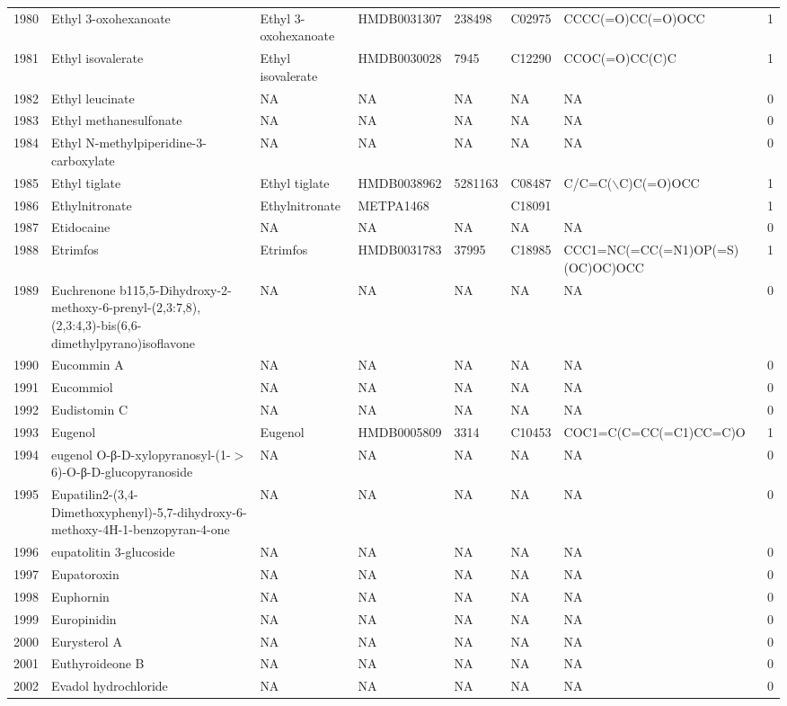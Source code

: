 \documentclass[a4paper]{article}
\begin{document}
\begin{longtable}{rlllllll}
  1980 & Ethyl 3-oxohexanoate & Ethyl 3-oxohexanoate & HMDB0031307 & 238498 & C02975 & CCCC(=O)CC(=O)OCC & 1 \\ 
  1981 & Ethyl isovalerate & Ethyl isovalerate & HMDB0030028 & 7945 & C12290 & CCOC(=O)CC(C)C & 1 \\ 
  1982 & Ethyl leucinate & NA & NA & NA & NA & NA & 0 \\ 
  1983 & Ethyl methanesulfonate & NA & NA & NA & NA & NA & 0 \\ 
  1984 & Ethyl N-methylpiperidine-3-carboxylate & NA & NA & NA & NA & NA & 0 \\ 
  1985 & Ethyl tiglate & Ethyl tiglate & HMDB0038962 & 5281163 & C08487 & C/C=C($\backslash$C)C(=O)OCC & 1 \\ 
  1986 & Ethylnitronate & Ethylnitronate & METPA1468 &  & C18091 &  & 1 \\ 
  1987 & Etidocaine & NA & NA & NA & NA & NA & 0 \\ 
  1988 & Etrimfos & Etrimfos & HMDB0031783 & 37995 & C18985 & CCC1=NC(=CC(=N1)OP(=S)(OC)OC)OCC & 1 \\ 
  1989 & Euchrenone b115,5-Dihydroxy-2-methoxy-6-prenyl-(2,3:7,8),(2,3:4,3)-bis(6,6-dimethylpyrano)isoflavone & NA & NA & NA & NA & NA & 0 \\ 
  1990 & Eucommin A & NA & NA & NA & NA & NA & 0 \\ 
  1991 & Eucommiol & NA & NA & NA & NA & NA & 0 \\ 
  1992 & Eudistomin C & NA & NA & NA & NA & NA & 0 \\ 
  1993 & Eugenol & Eugenol & HMDB0005809 & 3314 & C10453 & COC1=C(C=CC(=C1)CC=C)O & 1 \\ 
  1994 & eugenol O-β-D-xylopyranosyl-(1-$>$6)-O-β-D-glucopyranoside & NA & NA & NA & NA & NA & 0 \\ 
  1995 & Eupatilin2-(3,4-Dimethoxyphenyl)-5,7-dihydroxy-6-methoxy-4H-1-benzopyran-4-one & NA & NA & NA & NA & NA & 0 \\ 
  1996 & eupatolitin 3-glucoside & NA & NA & NA & NA & NA & 0 \\ 
  1997 & Eupatoroxin & NA & NA & NA & NA & NA & 0 \\ 
  1998 & Euphornin & NA & NA & NA & NA & NA & 0 \\ 
  1999 & Europinidin & NA & NA & NA & NA & NA & 0 \\ 
  2000 & Eurysterol A & NA & NA & NA & NA & NA & 0 \\ 
  2001 & Euthyroideone B & NA & NA & NA & NA & NA & 0 \\ 
  2002 & Evadol hydrochloride & NA & NA & NA & NA & NA & 0 \\ 

\end{longtable}
\end{document}
